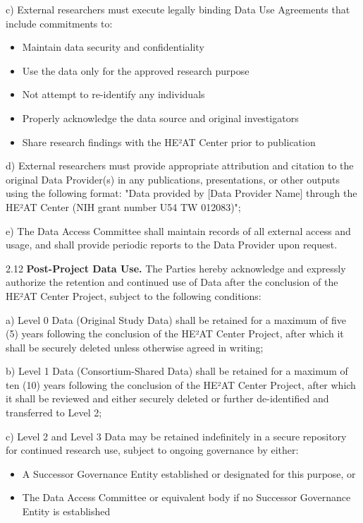 \documentclass[12pt,letterpaper]{article}
\newcommand{\added}[1]{\textcolor{addcolor}{#1}}
\begin{document}
\added{c) External researchers must execute legally binding Data Use Agreements that include commitments to:}
\added{\begin{itemize}
\item Maintain data security and confidentiality
\item Use the data only for the approved research purpose
\item Not attempt to re-identify any individuals
\item Properly acknowledge the data source and original investigators
\item Share research findings with the HE²AT Center prior to publication
\end{itemize}}

\added{d) External researchers must provide appropriate attribution and citation to the original Data Provider(s) in any publications, presentations, or other outputs using the following format: "Data provided by [Data Provider Name] through the HE²AT Center (NIH grant number U54 TW 012083)";}

\added{e) The Data Access Committee shall maintain records of all external access and usage, and shall provide periodic reports to the Data Provider upon request.}

\added{2.12 \textbf{Post-Project Data Use.} The Parties hereby acknowledge and expressly authorize the retention and continued use of Data after the conclusion of the HE²AT Center Project, subject to the following conditions:}

\added{a) Level 0 Data (Original Study Data) shall be retained for a maximum of five (5) years following the conclusion of the HE²AT Center Project, after which it shall be securely deleted unless otherwise agreed in writing;}

\added{b) Level 1 Data (Consortium-Shared Data) shall be retained for a maximum of ten (10) years following the conclusion of the HE²AT Center Project, after which it shall be reviewed and either securely deleted or further de-identified and transferred to Level 2;}

\added{c) Level 2 and Level 3 Data may be retained indefinitely in a secure repository for continued research use, subject to ongoing governance by either:}
\added{\begin{itemize}
\item A Successor Governance Entity established or designated for this purpose, or
\item The Data Access Committee or equivalent body if no Successor Governance Entity is established
\end{itemize}}
\end{document}
